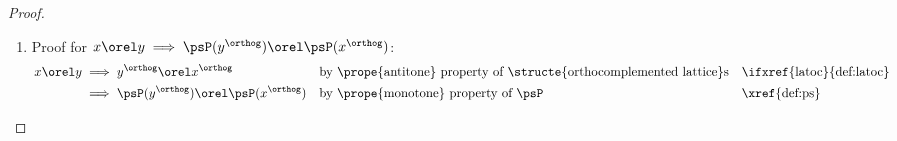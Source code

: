 \begin{proof}
\begin{enumerate}
\begin{enumerate}
        \item Then \ldots
          \begin{align*}
            1-\psP({x^\orthog})
              &= \psP(\lid)-\psP({x^\orthog})
              && \text{by \prope{normalized} property of $\psP$}
              && \text{\xref{def:ps}}
            \\&= \psP(x\join{x^\orthog})-\psP({x^\orthog})
              && \text{by \prope{excluded middle} property of ortho. lat.}
              && \text{\ifxref{latoc}{thm:latoc_prop}}
            \\&= \psP(x)+\psP({x^\orthog})-\psP({x^\orthog})
              && \text{by \prope{additive} property of $\ps$}
              && \text{\xref{item:ps_additive}}
            \\&= \psP(x)
              && \text{by field property of $\fieldR$}
          \end{align*}
        \end{enumerate}

    \item Proof for $x\orel y\implies\psP(y^\orthog) \orel \psP(x^\orthog)$:
      \begin{align*}
        x\orel y
          &\implies y^\orthog \orel x^\orthog
          && \text{by \prope{antitone} property of \structe{orthocomplemented lattice}s}
          && \text{\ifxref{latoc}{def:latoc}}
        \\&\implies \psP(y^\orthog) \orel \psP(x^\orthog)
          && \text{by \prope{monotone} property of $\psP$}
          && \text{\xref{def:ps}}
      \end{align*}
  \end{enumerate}
\end{proof}


